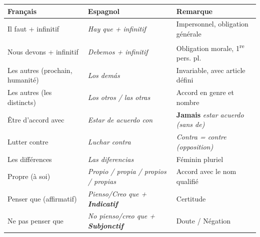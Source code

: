 \documentclass[11pt]{article}
\newcommand{\esp}[1]{\ifmmode\text{\textit{#1}}\else\begingroup\selectlanguage{spanish}\itshape #1\endgroup\fi}
\begin{document}
\begin{center}
\begin{tabularx}{\linewidth}{|X|X|X|}
\hline
\rowcolor{popblueL} \textbf{Français} & \textbf{Espagnol} & \textbf{Remarque} \\ \hline
Il faut + infinitif & \esp{Hay que} + infinitif & Impersonnel, obligation générale \\ \hline
Nous devons + infinitif & \esp{Debemos} + infinitif & Obligation morale, 1\textsuperscript{re} pers. pl. \\ \hline
Les autres (prochain, humanité) & \esp{Los demás} & Invariable, avec article défini \\ \hline
Les autres (les distincts) & \esp{Los otros / las otras} & Accord en genre et nombre \\ \hline
Être d'accord avec & \esp{Estar de acuerdo con} & \textbf{Jamais} \esp{*estar acuerdo} (sans \esp{de}) \\ \hline
Lutter contre & \esp{Luchar contra} & \esp{Contra} = contre (opposition) \\ \hline
Les différences & \esp{Las diferencias} & Féminin pluriel \\ \hline
Propre (à soi) & \esp{Propio / propia / propios / propias} & Accord avec le nom qualifié \\ \hline
Penser que (affirmatif) & \esp{Pienso/Creo que} + \textbf{Indicatif} & Certitude \\ \hline
Ne pas penser que & \esp{No pienso/creo que} + \textbf{Subjonctif} & Doute / Négation \\ \hline
\end{tabularx}
\end{center}
\end{document}
